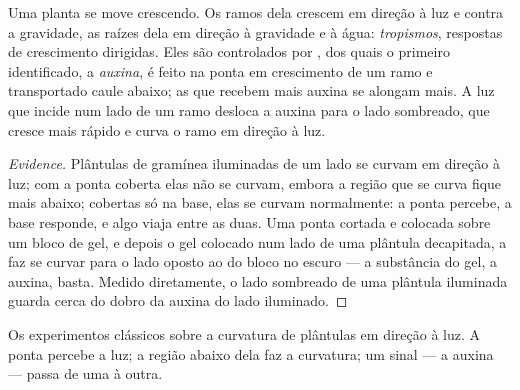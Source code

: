 \begin{proposition}\label{prop:g12:plant-rooted-life:tropisms}
Uma planta se move crescendo. Os ramos dela crescem em direção à luz e
contra a gravidade, as raízes dela em direção à gravidade e à água:
\emph{tropismos}, respostas de crescimento dirigidas.
Eles são controlados por , dos quais o primeiro identificado,
a \emph{auxina}, é feito na ponta em crescimento de um ramo e
transportado caule abaixo; as  que recebem mais auxina se
alongam mais. A luz que incide num lado de um ramo desloca a auxina
para o lado sombreado, que cresce mais rápido e curva o ramo em direção à luz.
\end{proposition}
\begin{proof}[Evidence]
Plântulas de gramínea iluminadas de um lado se curvam em direção à luz;
com a ponta coberta elas não se curvam, embora a região que se curva
fique mais abaixo; cobertas só na base, elas se curvam normalmente: a
ponta percebe, a base responde, e algo viaja entre as duas. Uma ponta
cortada e colocada sobre um bloco de gel, e depois o gel colocado num
lado de uma plântula decapitada, a faz se curvar para o lado oposto ao
do bloco no escuro --- a substância do gel, a auxina, basta. Medido
diretamente, o lado sombreado de uma plântula iluminada guarda cerca do
dobro da auxina do lado iluminado.
\end{proof}

\begin{omfigure}

{\small Os experimentos clássicos sobre a curvatura de plântulas em
direção à luz. A ponta percebe a luz; a região abaixo dela faz a
curvatura; um sinal --- a auxina --- passa de uma à outra.}
\end{omfigure}

